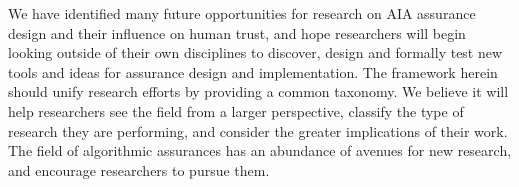 We have identified many future opportunities for research on AIA assurance design and their influence on human trust, and hope researchers will begin looking outside of their own disciplines to discover, design and formally test new tools and ideas for assurance design and implementation. The framework herein should unify research efforts by providing a common taxonomy. We believe it will help researchers see the field from a larger perspective, classify the type of research they are performing, and consider the greater implications of their work. The field of algorithmic assurances has an abundance of avenues for new research, and encourage researchers to pursue them.
